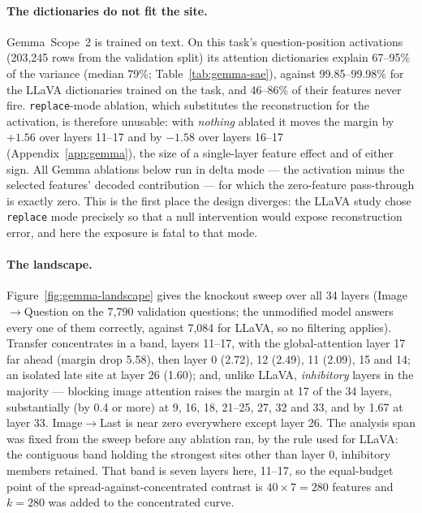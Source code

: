 \documentclass[11pt,a4paper]{article}
\begin{document}
\paragraph{The dictionaries do not fit the site.} Gemma~Scope~2 is trained on
text. On this task's question-position activations (203{,}245 rows from the
validation split) its attention dictionaries explain 67--95\% of the variance
(median 79\%; Table~\ref{tab:gemma-sae}), against 99.85--99.98\% for the
LLaVA dictionaries trained on the task, and 46--86\% of their features never
fire. \texttt{replace}-mode ablation, which substitutes the reconstruction for
the activation, is therefore unusable: with \emph{nothing} ablated it moves
the margin by $+1.56$ over layers 11--17 and by $-1.58$ over layers 16--17
(Appendix~\ref{app:gemma}), the size of a single-layer feature effect and of
either sign. All Gemma ablations below run in delta mode --- the activation
minus the selected features' decoded contribution --- for which the
zero-feature pass-through is exactly zero. This is the first place the design
diverges: the LLaVA study chose \texttt{replace} mode precisely so that a null
intervention would expose reconstruction error, and here the exposure is fatal
to that mode.

\paragraph{The landscape.} Figure~\ref{fig:gemma-landscape} gives the knockout
sweep over all 34 layers (Image$\rightarrow$Question on the 7{,}790
validation questions; the unmodified model answers every one of them
correctly, against 7{,}084 for LLaVA, so no filtering applies).
Transfer concentrates in a band, layers 11--17, with the global-attention
layer 17 far ahead (margin drop 5.58), then layer 0
(2.72), 12 (2.49), 11 (2.09), 15 and 14; an
isolated late site at layer 26 (1.60); and, unlike LLaVA,
\emph{inhibitory} layers in the majority --- blocking image attention raises
the margin at 17 of the 34 layers, substantially (by 0.4 or more) at 9, 16,
18, 21--25, 27, 32 and 33, and by 1.67 at layer 33. Image$\rightarrow$Last is near zero
everywhere except layer 26. The analysis span was fixed from the sweep before
any ablation ran, by the rule used for LLaVA: the contiguous band holding the
strongest sites other than layer 0, inhibitory members retained. That band is
seven layers here, 11--17, so the equal-budget point of the
spread-against-concentrated contrast is $40 \times 7 = 280$ features and
$k = 280$ was added to the concentrated curve.
\end{document}
